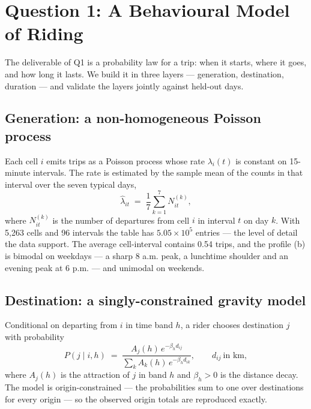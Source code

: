 \section{Question 1: A Behavioural Model of Riding}\label{sec:q1}

The deliverable of Q1 is a probability law for a trip: when it starts, where it goes,
and how long it lasts. We build it in three layers --- generation, destination,
duration --- and validate the layers jointly against held-out days.

\subsection{Generation: a non-homogeneous Poisson process}

Each cell $i$ emits trips as a Poisson process whose rate $\lambda_{i}(t)$ is constant
on 15-minute intervals. The rate is estimated by the sample mean of the counts in that
interval over the seven typical days,
\begin{equation}
\hat\lambda_{it} \;=\; \frac{1}{7}\sum_{k=1}^{7} N_{it}^{(k)},
\end{equation}
where $N^{(k)}_{it}$ is the number of departures from cell $i$ in interval $t$ on day
$k$. With 5,263 cells and 96 intervals the table has $5.05\times10^{5}$ entries ---
the level of detail the data support. The average cell-interval contains
0.54 trips, and the profile (b) is bimodal on weekdays --- a sharp
8 a.m. peak, a lunchtime shoulder and an evening peak at 6 p.m. --- and unimodal on
weekends.

\subsection{Destination: a singly-constrained gravity model}

Conditional on departing from $i$ in time band $h$, a rider chooses destination $j$
with probability
\begin{equation}
P(j\mid i,h) \;=\; \frac{A_j(h)\,e^{-\beta_h d_{ij}}}
                        {\sum_{k} A_k(h)\,e^{-\beta_h d_{ik}}},
\qquad d_{ij}\ \text{in km},
\label{eq:gravity}
\end{equation}
where $A_j(h)$ is the attraction of $j$ in band $h$ and $\beta_h>0$ is the distance
decay. The model is origin-constrained --- the probabilities sum to one over
destinations for every origin --- so the observed origin totals are reproduced exactly.

